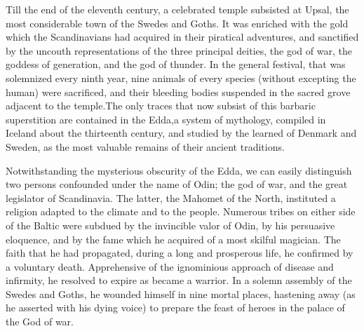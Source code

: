 


Till the end of the eleventh century, a celebrated temple
subsisted at Upsal, the most considerable town of the Swedes and
Goths. It was enriched with the gold which the Scandinavians had
acquired in their piratical adventures, and sanctified by the
uncouth representations of the three principal deities, the god
of war, the goddess of generation, and the god of thunder. In the
general festival, that was solemnized every ninth year, nine
animals of every species (without excepting the human) were
sacrificed, and their bleeding bodies suspended in the sacred
grove adjacent to the temple.\footnotemark[9] The only traces that now subsist
of this barbaric superstition are contained in the Edda,\footnotemark[901] a
system of mythology, compiled in Iceland about the thirteenth
century, and studied by the learned of Denmark and Sweden, as the
most valuable remains of their ancient traditions.



Notwithstanding the mysterious obscurity of the Edda, we can
easily distinguish two persons confounded under the name of Odin;
the god of war, and the great legislator of Scandinavia. The
latter, the Mahomet of the North, instituted a religion adapted
to the climate and to the people. Numerous tribes on either side
of the Baltic were subdued by the invincible valor of Odin, by
his persuasive eloquence, and by the fame which he acquired of a
most skilful magician. The faith that he had propagated, during a
long and prosperous life, he confirmed by a voluntary death.
Apprehensive of the ignominious approach of disease and
infirmity, he resolved to expire as became a warrior. In a solemn
assembly of the Swedes and Goths, he wounded himself in nine
mortal places, hastening away (as he asserted with his dying
voice) to prepare the feast of heroes in the palace of the God of
war.\footnotemark[10]

